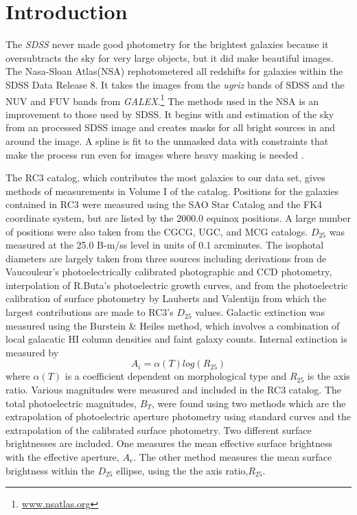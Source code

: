 \documentclass[12pt,preprint,pdftex]{aastex}
\newcommand{\project}[1]{\textsl{#1}}
\begin{document}
\section{Introduction}

The \project{SDSS} never made good photometry for the brightest galaxies because it oversubtracts the sky for very large objects, but it did make beautiful images. The Nasa-Sloan Atlas(NSA) rephotometered all redshifts for galaxies within the SDSS Data Release 8. It takes the images from the \textit{ugriz} bands of SDSS and the NUV and FUV bands from \textit{GALEX}.\footnote{\url{www.nsatlas.org}} The methods used in the NSA is an improvement to those used by SDSS. It begins with and estimation of the sky from an processed SDSS image and creates masks for all bright sources in and around the image. A spline is fit to the unmasked data with constraints that make the process run even for images where heavy masking is needed \citep{blanton11}. 

The RC3 catalog, which contributes the most galaxies to our data set, gives methods of measurements in Volume I of the catalog. Positions for the galaxies contained in RC3 were measured using the SAO Star Catalog and the FK4 coordinate system, but are listed by the 2000.0 equinox positions. A large number of positions were also taken from the CGCG, UGC, and MCG catalogs. $D_{25}$ was measured at the 25.0 B-m/ss level in units of 0.1 arcminutes. The isophotal diameters are largely taken from three sources including derivations from de Vaucouleur's photoelectrically calibrated photographic and CCD photometry, interpolation of R.Buta's photoelectric growth curves, and from the photoelectric calibration of surface photometry by Lauberts and Valentijn from which the largest contributions are made to RC3's $D_{25}$ values. Galactic extinction was measured using the Burstein \& Heiles method, which involves a combination of local galacatic HI column densities and faint galaxy counts. Internal extinction is measured by \begin{equation} A_i= \alpha(T)log(R_{25}) \end{equation} where $\alpha(T)$ is a coefficient dependent on morphological type and $R_{25}$ is the axis ratio. Various magnitudes were measured and included in the RC3 catalog. The total photoelectric magnitudes, $B_T$, were found using two methods which are the extrapolation of photoelectric aperture photometry using standard curves and the extrapolation of the calibrated surface photometry. Two different surface brightnesses are included. One measures the mean effective surface brightness with the effective aperture, $A_e$. The other method measures the mean surface brightness within the $D_{25}$ ellipse, using the the axis ratio,$R_{25}$\citep{rc3}.
\end{document}
